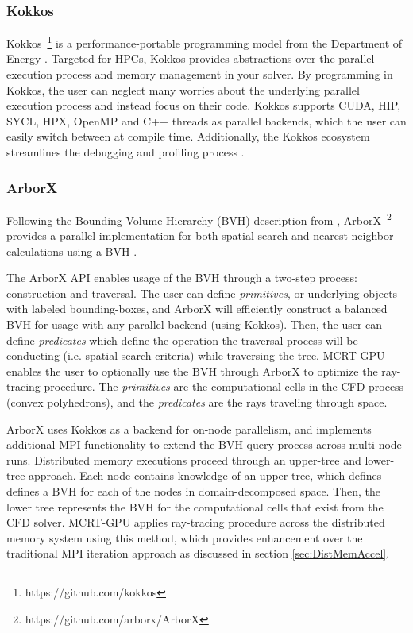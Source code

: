 \subsubsection{Kokkos}
Kokkos~\footnote{https://github.com/kokkos} is a performance-portable programming model from the Department of Energy \cite{Trott_Kokkos3_2022,TrottKokkosOGPaper2014}. 
Targeted for HPCs, Kokkos provides abstractions over the parallel execution process and memory management in your solver. By programming in Kokkos, the user can neglect many worries about the underlying parallel execution process and instead focus on their code.
Kokkos supports CUDA, HIP, SYCL, HPX, OpenMP and C++ threads as parallel backends, which the user can easily switch between at compile time.
Additionally, the Kokkos ecosystem streamlines the debugging and profiling process \cite{Trott_KokkosEcosystem2021}.

\subsubsection{ArborX}
Following the Bounding Volume Hierarchy (BVH) description from \citet{Karras2012MaximizingTrees}, ArborX~\footnote{https://github.com/arborx/ArborX} provides a parallel implementation for both spatial-search and nearest-neighbor calculations using a BVH \cite{Lebrun-Grandie2019ArborX:Library}.

The ArborX API enables usage of the BVH through a two-step process: construction and traversal. The user can define \textit{primitives}, or underlying objects with labeled bounding-boxes, and ArborX will efficiently construct a balanced BVH for usage with any parallel backend (using Kokkos). Then, the user can define \textit{predicates} which define the operation the traversal process will be conducting (i.e. spatial search criteria) while traversing the tree.
MCRT-GPU enables the user to optionally use the BVH through ArborX to optimize the ray-tracing procedure. The \textit{primitives} are the computational cells in the CFD process (convex polyhedrons), and the \textit{predicates} are the rays traveling through space.

ArborX uses Kokkos as a backend for on-node parallelism, and implements additional MPI functionality to extend the BVH query process across multi-node runs. Distributed memory executions proceed through an upper-tree and lower-tree approach.
Each node contains knowledge of an upper-tree, which defines defines a BVH for each of the nodes in domain-decomposed space. Then, the lower tree represents the BVH for the computational cells that exist from the CFD solver. 
MCRT-GPU applies ray-tracing procedure across the distributed memory system using this method, which provides enhancement over the traditional MPI iteration approach as discussed in section \ref{sec:DistMemAccel}.

